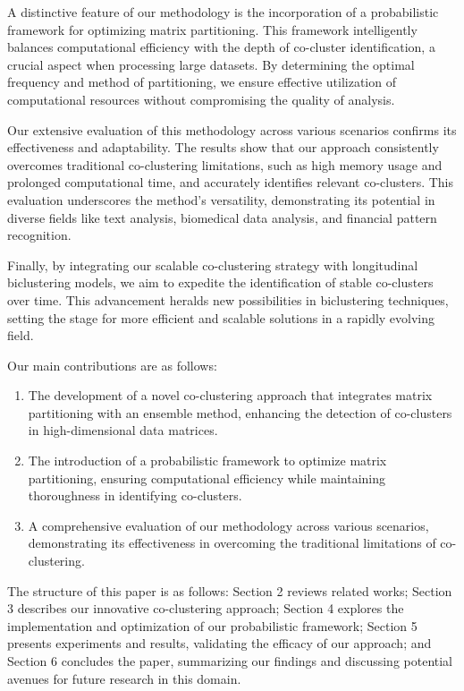 A distinctive feature of our methodology is the incorporation of a probabilistic framework for optimizing matrix partitioning. This framework intelligently balances computational efficiency with the depth of co-cluster identification, a crucial aspect when processing large datasets. By determining the optimal frequency and method of partitioning, we ensure effective utilization of computational resources without compromising the quality of analysis.

Our extensive evaluation of this methodology across various scenarios confirms its effectiveness and adaptability. The results show that our approach consistently overcomes traditional co-clustering limitations, such as high memory usage and prolonged computational time, and accurately identifies relevant co-clusters. This evaluation underscores the method's versatility, demonstrating its potential in diverse fields like text analysis, biomedical data analysis, and financial pattern recognition.

Finally, by integrating our scalable co-clustering strategy with longitudinal biclustering models, we aim to expedite the identification of stable co-clusters over time. This advancement heralds new possibilities in biclustering techniques, setting the stage for more efficient and scalable solutions in a rapidly evolving field.

Our main contributions are as follows:

\begin{enumerate}
    \item The development of a novel co-clustering approach that integrates matrix partitioning with an ensemble method, enhancing the detection of co-clusters in high-dimensional data matrices.
    \item The introduction of a probabilistic framework to optimize matrix partitioning, ensuring computational efficiency while maintaining thoroughness in identifying co-clusters.
    \item A comprehensive evaluation of our methodology across various scenarios, demonstrating its effectiveness in overcoming the traditional limitations of co-clustering.
\end{enumerate}

The structure of this paper is as follows: Section 2 reviews related works; Section 3 describes our innovative co-clustering approach; Section 4 explores the implementation and optimization of our probabilistic framework; Section 5 presents experiments and results, validating the efficacy of our approach; and Section 6 concludes the paper, summarizing our findings and discussing potential avenues for future research in this domain.

\cite{yan2019CrossModalityBridgingKnowledge, acharya2014OptimizationFrameworkCombining}\cite{asheri2021NewEMAlgorithm, al-moslmi2019BidirectionalFeatureTransfer} \cite{WeiShengFuLiBuJiBingGuanZhiShu2021MRNAYimiaojiezhonghouxinjiyanXinbaomoyanzhiyin}